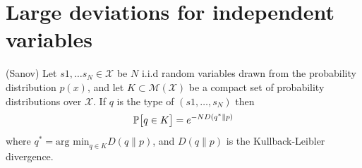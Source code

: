 \documentclass[letterpaper,english,12pt]{article}
\begin{document}
  \section{Large deviations for independent variables}
  \begin{thm}(Sanov) Let $s1,\dots s_N\in\mathcal{X}$ be $N$ i.i.d random variables drawn from the probability distribution $p(x)$, and let $K\subset \mathcal{M(X)}$ be a compact set of probability distributions over $\mathcal{X}$. If $q$ is the type of $(s1,\dots,s_N)$ then
  \begin{equation}
      \P\big[q\in K\big]= e^{-ND(q^*\parallel p)}
  \end{equation}
  where $q^* = \text{arg min}_{q\in K}D(q\parallel p)$, and $D(q\parallel p)$ is the Kullback-Leibler divergence.
  \end{thm}
  
 
\end{document}
